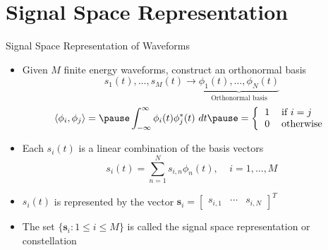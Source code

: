 \documentclass[t]{beamer}
\begin{document}
\section{Signal Space Representation}
\begin{frame}{Signal Space Representation of Waveforms}
  \footnotesize
  \begin{itemize}
    \item \pause Given $M$ finite energy waveforms, construct an orthonormal basis
      \begin{equation*}
        s_1(t),\ldots,s_M(t) \rightarrow \underbrace{\phi_1(t),\ldots,\phi_N(t)}_{\text{Orthonormal basis}}
      \end{equation*}
      \pause
      \begin{equation*}
        \langle \phi_i, \phi_j \rangle = \pause \int_{-\infty}^{\infty} \phi_i(t) \phi_j^*(t) \ dt \pause = \left\{ \begin{tabular}{ll}
                                                                                                                      1 & \text{if $i = j$} \\
                                                                                                                      0 & \text{otherwise}
                                                                                                                    \end{tabular}
                                                                                                            \right.
      \end{equation*}
    \item \pause Each $s_i(t)$ is a linear combination of the basis vectors
      \begin{equation*}
        s_i(t) = \sum_{n=1}^{N} s_{i,n} \phi_n(t), \ \ \ \ \ i=1,\ldots,M
      \end{equation*}
    \item \pause $s_i(t)$ is represented by the vector $\mathbf{s}_i = \begin{bmatrix} s_{i,1} & \cdots & s_{i,N}  \end{bmatrix}^T$
    \item \pause The set $\{\mathbf{s}_i: 1 \leq i \leq M\}$ is called the signal space representation \pause or constellation
  \end{itemize}
  \normalsize
\end{frame}
\end{document}
